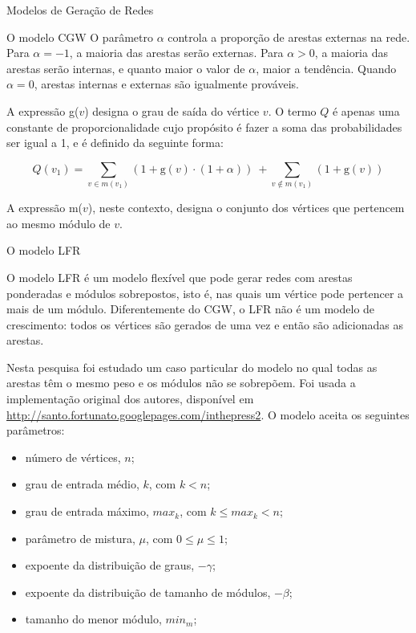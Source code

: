 \begin{section}{Modelos de Geração de Redes}
\begin{subsection}{O modelo CGW}
O parâmetro $\alpha$ controla a proporção de arestas externas na rede. Para $\alpha = -1$, a maioria das arestas serão externas. Para $\alpha > 0$, a maioria das arestas serão internas, e quanto maior o valor de $\alpha$, maior a tendência. Quando $\alpha = 0$, arestas internas e externas são igualmente prováveis.

A expressão g($v$) designa o grau de saída do vértice $v$. O termo $Q$ é apenas uma constante de proporcionalidade cujo propósito é fazer a soma das probabilidades ser igual a 1, e é definido da seguinte forma:

$$
Q(v_1) = \sum_{v \in m(v_1)} (1 + \mathrm{g}(v) \cdot (1 + \alpha))
~+ \sum_{v \notin m(v_1)} (1 + \mathrm{g}(v))
$$

A expressão m($v$), neste contexto, designa o conjunto dos vértices que pertencem ao mesmo módulo de $v$.

\end{subsection}

\begin{subsection}{O modelo LFR}

O modelo LFR \cite{Lancichinetti2008,Lancichinetti2009} é um modelo flexível que pode gerar redes com arestas ponderadas e módulos sobrepostos, isto é, nas quais um vértice pode pertencer a mais de um módulo. Diferentemente do CGW, o LFR não é um modelo de crescimento: todos os vértices são gerados de uma vez e então são adicionadas as arestas.

Nesta pesquisa foi estudado um caso particular do modelo no qual todas as arestas têm o mesmo peso e os módulos não se sobrepõem. Foi usada a implementação original dos autores, disponível em  \url{http://santo.fortunato.googlepages.com/inthepress2}. O modelo aceita os seguintes parâmetros:

\begin{itemize}
\item número de vértices, $n$;
\item grau de entrada médio, $k$, com $k < n$;
\item grau de entrada máximo, $max_k$, com $k \le max_k < n$;
\item parâmetro de mistura, $\mu$, com $0 \le \mu \le 1$;
\item expoente da distribuição de graus, $-\gamma$;
\item expoente da distribuição de tamanho de módulos, $-\beta$;
\item tamanho do menor módulo, $min_m$;
\end{itemize}


\end{subsection}
\end{section}
